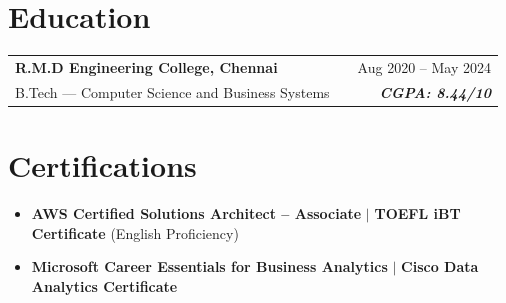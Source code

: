 \documentclass[a4paper,10pt]{article}
\begin{document}
\section{Education}
\begin{tabularx}{\linewidth}{ @{}l X r@{} }
\color[HTML]{1C033C} \textbf{R.M.D Engineering College, Chennai} & & \hfill \color[HTML]{371e77} Aug 2020 -- May 2024 \\
\color[HTML]{371e77} B.Tech — Computer Science and Business Systems & & \hfill \color[HTML]{4B28A4} \textit{\textbf{CGPA: 8.44/10}}
\end{tabularx}

\section{Certifications}
\begin{itemize}[nosep, leftmargin=2em]
\item \textbf{AWS Certified Solutions Architect – Associate} $|$ \textbf{TOEFL iBT Certificate} (English Proficiency)
\item \textbf{Microsoft Career Essentials for Business Analytics} $|$ \textbf{Cisco Data Analytics Certificate}
\end{itemize}
\end{document}
